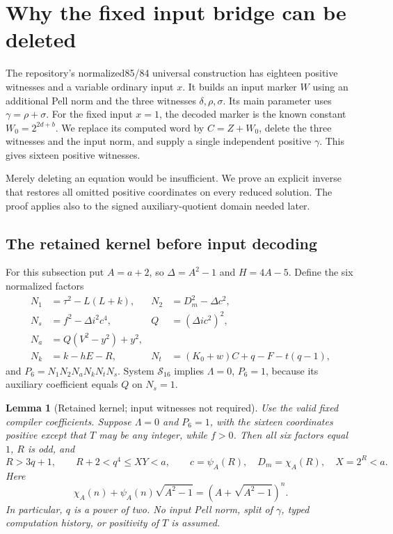 \documentclass[11pt]{article}
\newtheorem{lemma}[theorem]{Lemma}
\theoremstyle{remark}\newtheorem{remark}[theorem]{Remark}
\begin{document}
\section{Why the fixed input bridge can be deleted}\label{sec:deletion}

The repository's normalized85/84 universal construction has eighteen positive witnesses and a variable ordinary input $x$. It builds an input marker $W$ using an additional Pell norm and the three witnesses $\delta,\rho,\sigma$. Its main parameter uses $\gamma=\rho+\sigma$. For the fixed input $x=1$, the decoded marker is the known constant $W_0=2^{2d+b}$. We replace its computed word by $C=Z+W_0$, delete the three witnesses and the input norm, and supply a single independent positive $\gamma$. This gives sixteen positive witnesses.

Merely deleting an equation would be insufficient. We prove an explicit inverse that restores all omitted positive coordinates on every reduced solution. The proof applies also to the signed auxiliary-quotient domain needed later.

\subsection{The retained kernel before input decoding}

For this subsection put $A=a+2$, so $\Delta=A^2-1$ and $H=4A-5$. Define the six normalized factors
\begin{align*}
 N_1&=\tau^2-L(L+k),& N_2&=D_m^2-\Delta c^2,\\
 N_s&=f^2-\Delta i^2c^4,& Q&=(\Delta ic^2)^2,\\
 N_a&=Q(V^2-y^2)+y^2,\\
 N_k&=k-hE-R,&N_t&=(K_0+w)C+q-F-t(q-1),
\end{align*}
and $P_6=N_1N_2N_aN_kN_tN_s$. System $\mathcal S_{16}$ implies $\Lambda=0$, $P_6=1$, because its auxiliary coefficient equals $Q$ on $N_s=1$.

\begin{lemma}[Retained kernel; input witnesses not required]\label{lem:kernel}
Use the valid fixed compiler coefficients. Suppose $\Lambda=0$ and $P_6=1$, with the sixteen coordinates positive except that $T$ may be any integer, while $f>0$. Then all six factors equal $1$, $R$ is odd, and
\[
 R>3q+1,\qquad R+2<q^4\le XY<a,\qquad
 c=\psi_A(R),\quad D_m=\chi_A(R),\quad X=2^R<a.
\]
Here
\[
 \chi_A(n)+\psi_A(n)\sqrt{A^2-1}
       =(A+\sqrt{A^2-1})^n.
\]
In particular, $q$ is a power of two. No input Pell norm, split of $\gamma$, typed computation history, or positivity of $T$ is assumed.
\end{lemma}
\end{document}
